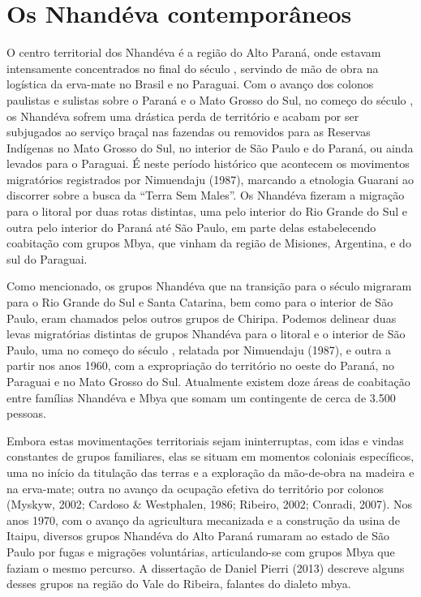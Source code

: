 {{\section{Os Nhandéva contemporâneos}

O centro territorial dos Nhandéva é a região do Alto Paraná, onde
estavam intensamente concentrados no final do século , servindo de
mão de obra na logística da erva-mate no Brasil e no Paraguai. Com o
avanço dos colonos paulistas e sulistas sobre o Paraná e o Mato Grosso
do Sul, no começo do século , os Nhandéva sofrem uma drástica perda
de território e acabam por ser subjugados ao serviço braçal nas
fazendas ou removidos para as Reservas Indígenas no Mato Grosso do Sul,
no interior de São Paulo e do Paraná, ou ainda levados para o Paraguai.
É neste período histórico que acontecem os movimentos migratórios
registrados por Nimuendaju (1987), marcando a etnologia Guarani ao
discorrer sobre a busca da ``Terra Sem Males''. Os Nhandéva fizeram a
migração para o litoral por duas rotas distintas, uma pelo interior do
Rio Grande do Sul e outra pelo interior do Paraná até São Paulo, em
parte delas estabelecendo coabitação com grupos Mbya, que vinham da
região de Misiones, Argentina, e do sul do Paraguai.

Como mencionado, os grupos Nhandéva que na transição para o século 
migraram para o Rio Grande do Sul e Santa Catarina, bem como para o
interior de São Paulo, eram chamados pelos outros grupos de Chiripa.
Podemos delinear duas levas migratórias distintas de grupos Nhandéva
para o litoral e o interior de São Paulo, uma no começo do século ,
relatada por Nimuendaju (1987), e outra a partir nos anos 1960, com a
expropriação do território no oeste do Paraná, no Paraguai e no Mato
Grosso do Sul. Atualmente existem doze áreas de coabitação entre
famílias Nhandéva e Mbya que somam um contingente de cerca de 3.500
pessoas.

Embora estas movimentações territoriais sejam ininterruptas, com idas e
vindas constantes de grupos familiares, elas se situam em momentos
coloniais específicos, uma no início da titulação das terras e a
exploração da mão-de-obra na madeira e na erva-mate; outra no avanço da
ocupação efetiva do território por colonos (Myskyw, 2002; Cardoso \&
Westphalen, 1986; Ribeiro, 2002; Conradi, 2007). Nos anos 1970, com o
avanço da agricultura mecanizada e a construção da usina de Itaipu,
diversos grupos Nhandéva do Alto Paraná rumaram ao estado de São Paulo
por fugas e migrações voluntárias, articulando-se com grupos Mbya que
faziam o mesmo percurso. A dissertação de Daniel Pierri (2013) descreve
alguns desses grupos na região do Vale do Ribeira, falantes do dialeto
mbya.

}}
